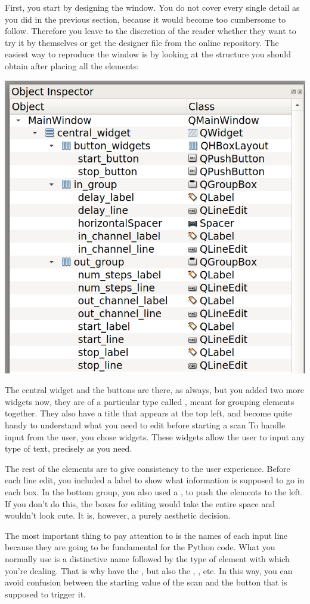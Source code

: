First, you start by designing the window. You do not cover every single detail as you did in the previous section, because it would become too cumbersome to follow. Therefore you leave to the discretion of the reader whether they want to try it by themselves or get the designer file from the online repository. The easiest way to reproduce the window is by looking at the structure you should obtain after placing all the elements:

\begin{center}
    \includegraphics[width=.5\textwidth]{images/Chapter_09/09_final_window_structure.png}
\end{center}

The central widget and the buttons are there, as always, but you added two more widgets now, they are of a particular type called , meant for grouping elements together. They also have a title that appears at the top left, and become quite handy to understand what you need to edit before starting a scan To handle input from the user, you chose  widgets. These widgets allow the user to input any type of text, precisely as you need.

The rest of the elements are to give consistency to the user experience. Before each line edit, you included a label to show what information is supposed to go in each box. In the bottom group, you also used a , to push the elements to the left. If you don't do this, the boxes for editing would take the entire space and wouldn't look cute. It is, however, a purely aesthetic decision.

The most important thing to pay attention to is the names of each input line because they are going to be fundamental for the Python code. What you normally use is a distinctive name followed by the type of element with which you're dealing. That is why have the , but also the , , etc. In this way, you can avoid confusion between the starting value of the scan and the button that is supposed to trigger it.

